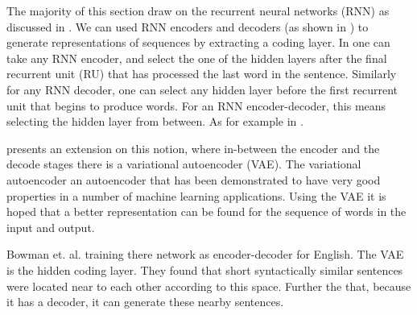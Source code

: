 \documentclass[12pt,parskip]{komatufte}
\begin{document}
The majority of this section draw on the recurrent neural networks (RNN) as discussed in .
We can used RNN encoders and decoders (as shown in ) to generate representations of sequences by extracting a coding layer.
In one can take any RNN encoder,
and select the one of the hidden layers after the final recurrent unit (RU) that has processed the last word in the sentence.
Similarly for any RNN decoder, one can select any hidden layer before the first recurrent unit that begins to produce words.
For an RNN encoder-decoder, this means selecting the hidden layer from between.
As for example in .


 presents an extension on this notion,
where in-between the encoder and the decode stages there is a variational autoencoder (VAE).
The variational autoencoder  an autoencoder that has been demonstrated to have very good properties in a number of machine learning applications.
Using the VAE it is hoped that a better representation can be found for the sequence of words in the input and output.

Bowman et. al. training there network as encoder-decoder for English.
The VAE is the hidden coding layer.
They found that short syntactically similar sentences were located near to each other according to this space.
Further the that, because it has a decoder, it can generate these nearby sentences.

\begin{figure}
	
	
\end{figure}
\end{document}
